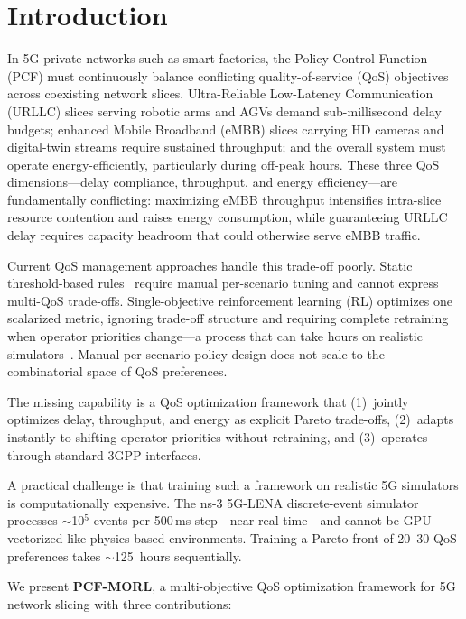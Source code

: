\documentclass[conference]{IEEEtran}
\begin{document}
\section{Introduction}\label{sec:intro}

In 5G private networks such as smart factories, the Policy Control Function (PCF) must continuously balance conflicting quality-of-service (QoS) objectives across coexisting network slices.
Ultra-Reliable Low-Latency Communication (URLLC) slices serving robotic arms and AGVs demand sub-millisecond delay budgets; enhanced Mobile Broadband (eMBB) slices carrying HD cameras and digital-twin streams require sustained throughput; and the overall system must operate energy-efficiently, particularly during off-peak hours.
These three QoS dimensions---delay compliance, throughput, and energy efficiency---are fundamentally conflicting: maximizing eMBB throughput intensifies intra-slice resource contention and raises energy consumption, while guaranteeing URLLC delay requires capacity headroom that could otherwise serve eMBB traffic.

Current QoS management approaches handle this trade-off poorly.
Static threshold-based rules~\cite{ts23503} require manual per-scenario tuning and cannot express multi-QoS trade-offs.
Single-objective reinforcement learning (RL) optimizes one scalarized metric, ignoring trade-off structure and requiring complete retraining when operator priorities change---a process that can take hours on realistic simulators~\cite{ns3gym}.
Manual per-scenario policy design does not scale to the combinatorial space of QoS preferences.

The missing capability is a QoS optimization framework that (1)~jointly optimizes delay, throughput, and energy as explicit Pareto trade-offs, (2)~adapts instantly to shifting operator priorities without retraining, and (3)~operates through standard 3GPP interfaces.

A practical challenge is that training such a framework on realistic 5G simulators is computationally expensive.
The ns-3 5G-LENA discrete-event simulator~\cite{5glena} processes $\sim$10$^5$ events per 500\,ms step---near real-time---and cannot be GPU-vectorized like physics-based environments.
Training a Pareto front of 20--30 QoS preferences takes $\sim$125~hours sequentially.

We present \textbf{PCF-MORL}, a multi-objective QoS optimization framework for 5G network slicing with three contributions:
\end{document}
